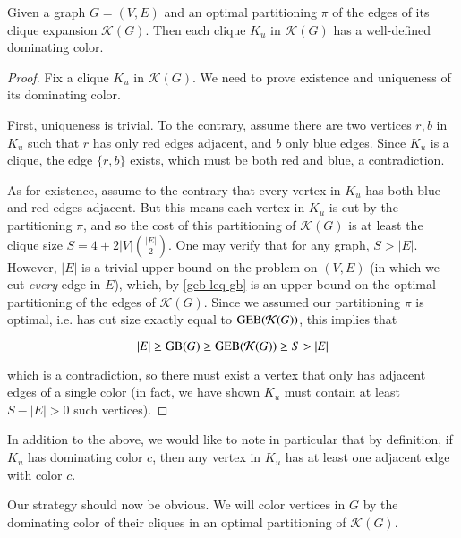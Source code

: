 	\begin{lemma}
		\label{dom-col}
		Given a graph $G = (V, E)$ and an optimal partitioning $\pi$
		of the edges of its clique
		expansion $\mathcal{K}(G)$. Then each clique $K_u$ in $\mathcal{K}(G)$
		has a well-defined dominating color.
	\end{lemma}
	\begin{proof}
		Fix a clique $K_u$ in $\mathcal{K}(G)$. We need to prove existence and
		uniqueness of its dominating color.

		First, uniqueness is trivial. To the contrary, assume there are two
		vertices $r, b$ in $K_u$ such that $r$ has only red edges adjacent,
		and $b$ only blue edges. Since $K_u$ is a clique, the edge $\{r, b\}$
		exists, which must be both red and blue, a contradiction.

		As for existence, assume to the contrary that every vertex in $K_u$
		has both blue and red edges adjacent. But this means each vertex in
		$K_u$ is cut by the partitioning $\pi$, and so the cost of
		this partitioning of $\mathcal{K}(G)$ is at least the clique size
		$S = 4+2|V|\binom{|E|}{2}$. One may verify that for any graph,
		$S > |E|$. However, $|E|$ is a trivial upper bound on the \gb problem
		on $(V, E)$ (in which we cut \textit{every} edge in $E$),
		which, by \autoref{geb-leq-gb} is an upper bound on the optimal
		partitioning of the edges of $\mathcal{K}(G)$. Since we assumed our
		partitioning $\pi$ is optimal, i.e. has cut size
		exactly equal to $\textsc{GEB}(\mathcal{K}(G))$, this implies that

		$$|E| \geq \textsc{GB}(G) \geq \textsc{GEB}(\mathcal{K}(G)) \geq S > |E|$$

		which is a contradiction, so there must exist a vertex that only has
		adjacent edges of a single color (in fact, we have shown $K_u$ must
		contain at least $S - |E| > 0$ such vertices).
	\end{proof}

	In addition to the above, we would like to note in particular that by
	definition, if $K_u$ has dominating color $c$, then any vertex in $K_u$
	has at least one adjacent edge with color $c$.

	Our strategy should now be obvious. We will color vertices in $G$ by
	the dominating color of their cliques in an optimal partitioning of
	$\mathcal{K}(G)$.

